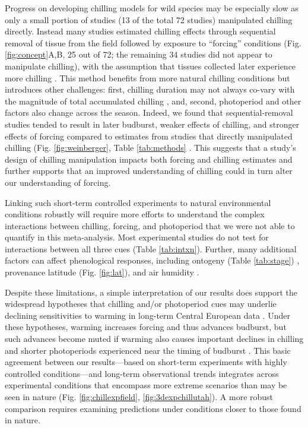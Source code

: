 \documentclass{article}
\begin{document}
\par Progress on developing chilling models for wild species may be especially slow as only a small portion of studies (13 of the total 72 studies) manipulated chilling directly. Instead many studies estimated chilling effects through sequential removal of tissue from the field followed by exposure to ``forcing'' conditions (Fig. \ref{fig:concept}A,B, 25 out of 72; the remaining 34 studies did not appear to manipulate chilling), with the assumption that tissues collected later experience more chilling \emph{\citep{weinberger1950}}. This method benefits from more natural chilling conditions but introduces other challenges: first, chilling duration may not always co-vary with the magnitude of total accumulated chilling \emph{\citep{dennis2003}}, and, second, photoperiod and other factors also change across the season. Indeed, we found that sequential-removal studies tended to result in later budburst, weaker effects of chilling, and stronger effects of forcing compared to estimates from studies that directly manipulated chilling (Fig. \ref{fig:weinberger}, Table \ref{tab:methods} \emph{\citep{weinberger1950,polgar2013}}. This suggests that a study's design of chilling manipulation impacts both forcing and chilling estimates and further supports that an improved understanding of chilling could in turn alter our understanding of forcing. 

\par Linking such short-term controlled experiments to natural environmental conditions robustly will require more efforts to understand the complex interactions between chilling, forcing, and photoperiod that we were not able to quantify in this meta-analysis. Most experimental studies do not test for interactions between all three cues (Table \ref{tab:intxn}). Further, many additional factors can affect phenological responses, including ontogeny (Table \ref{tab:stage}) \emph{\citep[][]{vitasse2013ont}}, provenance latitude (Fig. \ref{fig:lat}), and air humidity \emph{\citep{Laube:2014b}}. 

\par Despite these limitations, a simple interpretation of our results does support the widespread hypotheses that chilling and/or photoperiod cues may underlie declining sensitivities to warming in long-term Central European data \emph{\citep{Rutishauser:2008,yu2010,fu2015}}. Under these hypotheses, warming increases forcing and thus advances budburst, but such advances become muted if warming also causes important declines in chilling and shorter photoperiods experienced near the timing of budburst \emph{\citep{gauzere2019}}. This basic agreement between our results---based on short-term experiments with highly controlled conditions---and long-term observational trends integrates across experimental conditions that encompass more extreme scenarios than may be seen in nature (Fig. \ref{fig:chillexpfield}, \ref{fig:3dexpchillutah}). A more robust comparison requires examining predictions under conditions closer to those found in nature.
\end{document}
